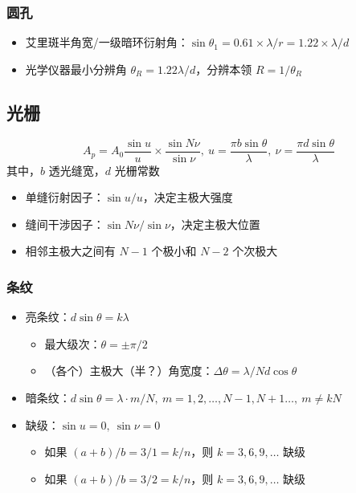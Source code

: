 \documentclass{article}
\begin{document}
\subsubsection{圆孔}

\begin{itemize}
    \item 艾里斑半角宽/一级暗环衍射角：$\sin\theta_1=0.61\times\lambda/r=1.22\times \lambda/d$
    \item 光学仪器最小分辨角 $\theta_R=1.22\lambda/d$，分辨本领 $R=1/\theta_R$
\end{itemize}

\subsection{光栅}

$$
A_p=A_0\frac{\sin u}{u}\times\frac{\sin N\nu}{\sin \nu},\ u=\frac{\pi b\sin\theta}{\lambda},\ \nu=\frac{\pi d\sin\theta}{\lambda}
$$
其中，$b$ 透光缝宽，$d$ 光栅常数
\begin{itemize}
    \item 单缝衍射因子：$\sin u/u$，决定主极大强度
    \item 缝间干涉因子：$\sin N\nu/\sin \nu$，决定主极大位置
    \item 相邻主极大之间有 $N-1$ 个极小和 $N-2$ 个次极大
\end{itemize}

\subsubsection{条纹}

\begin{itemize}
    \item 亮条纹：$d\sin\theta=k\lambda$ \begin{itemize}
        \item 最大级次：$\theta=\pm\pi/2$
        \item （各个）主极大（半？）角宽度：$\Delta\theta=\lambda/Nd\cos\theta$
    \end{itemize}
    \item 暗条纹：$d\sin\theta=\lambda\cdot m/N,\ m=1,2,\dots,N-1,N+1\dots,\ m\neq kN$
    \item 缺级：$\sin u=0,\ \sin\nu =0$ \begin{itemize}
        \item 如果 $(a+b)/b=3/1=k/n$，则 $k=3,6,9,\dots$ 缺级
        \item 如果 $(a+b)/b=3/2=k/n$，则 $k=3,6,9,\dots$ 缺级
    \end{itemize}
\end{itemize}
\end{document}

